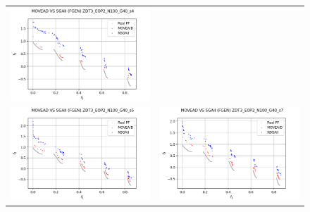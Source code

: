 \begin{figure}[H]
\begin{tabular}{c c}
    \includegraphics[scale=0.5]{figures/ZDT3_EOP2_N100_G40_T15/s4_comp.png}\\
    \includegraphics[scale=0.5]{figures/ZDT3_EOP2_N100_G40_T15/s5_comp.png} &
    \includegraphics[scale=0.5]{figures/ZDT3_EOP2_N100_G40_T15/s7_comp.png}\\

\end{tabular}
\end{figure}
